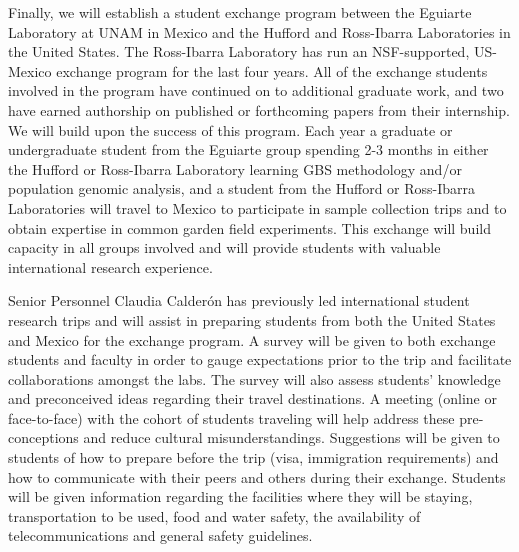 Finally, we will establish a student exchange program between the Eguiarte Laboratory at UNAM in Mexico and the Hufford and Ross-Ibarra Laboratories in the United States. The Ross-Ibarra Laboratory has run an NSF-supported, US-Mexico exchange program for the last four years.  
All of the exchange students involved in the program have continued on to additional graduate work, and two have earned authorship on published or forthcoming papers from their internship.  
We will build upon the success of this program.
Each year  a graduate or undergraduate student from the Eguiarte group spending 2-3 months in either the Hufford or Ross-Ibarra Laboratory learning GBS methodology and/or population genomic analysis, and a student from the Hufford or Ross-Ibarra Laboratories will travel to Mexico to participate in sample collection trips and to obtain expertise in common garden field experiments. 
This exchange will build capacity in all groups involved and will provide students with valuable international research experience.  

Senior Personnel Claudia Calder\'{o}n has previously led international student research trips and will assist in preparing students from both the United States and Mexico for the exchange program. A survey will be given to both exchange students and faculty in order to gauge expectations prior to the trip and facilitate collaborations amongst the labs.  The survey will also assess students' knowledge and preconceived ideas  regarding their travel destinations.  A meeting (online or face-to-face) with the cohort of students traveling will help address these pre-conceptions and reduce cultural misunderstandings.  Suggestions will be given to students of how to prepare before the trip (visa, immigration requirements) and how to communicate with their peers and others during their exchange.  Students will be given information regarding the facilities where they will be staying, transportation to be used, food and water safety, the availability of telecommunications and general safety guidelines.

 



